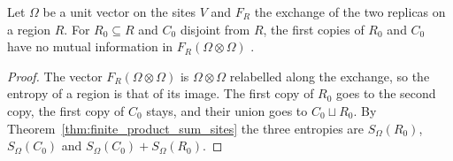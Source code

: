 \begin{theorem}
    \label{thm:finite_product_replica_swap_cores}
    \leanok
    Let $\Omega$ be a unit vector on the sites $V$ and $F_R$ the exchange of the two
    replicas on a region $R$. For $R_0\subseteq R$ and $C_0$ disjoint from $R$, the
    first copies of $R_0$ and $C_0$ have no mutual information in
    $F_R(\Omega\otimes\Omega)$ \cite[Section~2]{OpenAI2026PolynomialPEPS}.
\end{theorem}
\begin{proof}\leanok
    The vector $F_R(\Omega\otimes\Omega)$ is $\Omega\otimes\Omega$ relabelled along the
    exchange, so the entropy of a region is that of its image. The first copy of
    $R_0$ goes to the second copy, the first copy of $C_0$ stays, and their union goes
    to $C_0\sqcup R_0$. By Theorem~\ref{thm:finite_product_sum_sites} the three
    entropies are $S_\Omega(R_0)$, $S_\Omega(C_0)$ and $S_\Omega(C_0)+S_\Omega(R_0)$.
\end{proof}
